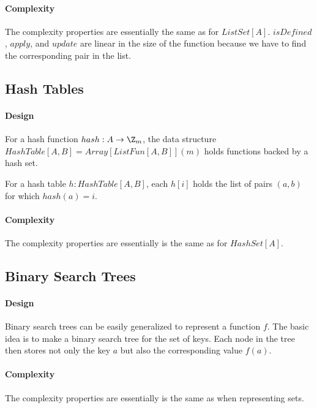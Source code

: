 \paragraph{Complexity}
The complexity properties are essentially the same as for $ListSet[A]$.
$isDefined$, $apply$, and $update$ are linear in the size of the function because we have to find the corresponding pair in the list.

\subsection{Hash Tables}

\paragraph{Design}
For a hash function $hash:A\to \Z_m$, the data structure $HashTable[A,B]=Array[ListFun[A,B]](m)$ holds functions backed by a hash set.

For a hash table $h:HashTable[A,B]$, each $h[i]$ holds the list of pairs $(a,b)$ for which $hash(a)=i$.

\paragraph{Complexity}
The complexity properties are essentially is the same as for $HashSet[A]$.

\subsection{Binary Search Trees}

\paragraph{Design}
Binary search trees can be easily generalized to represent a function $f$.
The basic idea is to make a binary search tree for the set of keys.
Each node in the tree then stores not only the key $a$ but also the corresponding value $f(a)$.

\paragraph{Complexity}
The complexity properties are essentially is the same as when representing sets.

